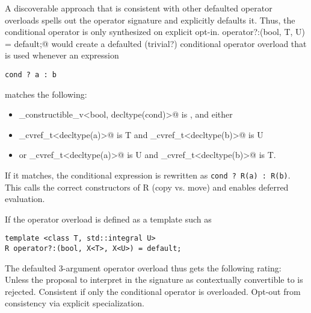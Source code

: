 \subsubsection{}\label{sec:3-arg operator}

A discoverable approach that is consistent with other defaulted operator overloads spells out the operator signature and explicitly defaults it.
Thus, the conditional operator is only synthesized on explicit opt-in.
\lstinline@R operator?:(bool, T, U) = default;@ would create a defaulted (trivial?) conditional operator overload that is used whenever an expression
\medskip\begin{lstlisting}[style=Vc]
cond ? a : b
\end{lstlisting}
matches the following:
\begin{itemize}
\item \lstinline@is_constructible_v<bool, decltype(cond)>@ is \true, and either
\item \lstinline@remove_cvref_t<decltype(a)>@ is \type T and \lstinline@remove_cvref_t<decltype(b)>@ is \type U
\item or \lstinline@remove_cvref_t<decltype(a)>@ is \type U and \lstinline@remove_cvref_t<decltype(b)>@ is \type T.
\end{itemize}

If it matches, the conditional expression is rewritten as \lstinline[style=Vc]@cond ? R(a) : R(b)@.
This calls the correct constructors of \type R (copy vs. move) and enables deferred evaluation.

If the operator overload is defined as a template such as
\medskip\begin{lstlisting}[style=Vc]
template <class T, std::integral U>
R operator?:(bool, X<T>, X<U>) = default;
\end{lstlisting}


The defaulted 3-argument operator overload thus gets the following rating:\\
\greatnesstable
{\good}
{\good}
{\good \undecided Unless the proposal to interpret \bool in the signature as contextually convertible to \bool is rejected.}
{\good}
{\undecided Consistent if only the conditional operator is overloaded. Opt-out from consistency via explicit  specialization.}

\subsubsection{}\label{sec:2-arg operator}

